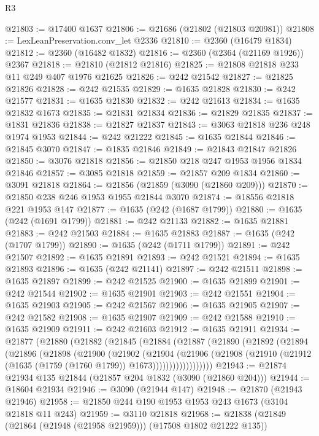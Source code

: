 \begin{lexlean}{R3}
\begin{coremodule}
@21803 := @17400 @1637
@21806 := @21686 (@21802 (@21803 @20981))
@21808 := LexLeanPreservation.conv_let @2336
@21810 := @2360 (@16479 @1834)
@21812 := @2360 (@16482 @1832)
@21816 := @2360 (@2364 (@21169 @1926)) @2367
@21818 := @21810 (@21812 @21816)
@21825 := @21808 @21818 @233 @11 @249 @407 @1976 @21625
@21826 := @242 @21542
@21827 := @21825 @21826
@21828 := @242 @21535
@21829 := @1635 @21828
@21830 := @242 @21577
@21831 := @1635 @21830
@21832 := @242 @21613
@21834 := @1635 @21832 @1673
@21835 := @21831 @21834
@21836 := @21829 @21835
@21837 := @1831 @21836
@21838 := @21827 @21837
@21843 := @3063 @21818 @236 @248 @1974 @1953
@21844 := @242 @21222
@21845 := @1635 @21844
@21846 := @21845 @3070
@21847 := @1835 @21846
@21849 := @21843 @21847 @21826
@21850 := @3076 @21818
@21856 := @21850 @218 @247 @1953 @1956 @1834 @21846
@21857 := @3085 @21818
@21859 := @21857 @209 @1834
@21860 := @3091 @21818
@21864 := @21856 (@21859 (@3090 (@21860 @209)))
@21870 := @21850 @238 @246 @1953 @1955 @21844 @3070
@21874 := @18556 @21818 @221 @1953 @147
@21877 := @1635 (@242 (@1687 @1799))
@21880 := @1635 (@242 (@1691 @1799))
@21881 := @242 @21133
@21882 := @1635 @21881
@21883 := @242 @21503
@21884 := @1635 @21883
@21887 := @1635 (@242 (@1707 @1799))
@21890 := @1635 (@242 (@1711 @1799))
@21891 := @242 @21507
@21892 := @1635 @21891
@21893 := @242 @21521
@21894 := @1635 @21893
@21896 := @1635 (@242 @21141)
@21897 := @242 @21511
@21898 := @1635 @21897
@21899 := @242 @21525
@21900 := @1635 @21899
@21901 := @242 @21544
@21902 := @1635 @21901
@21903 := @242 @21551
@21904 := @1635 @21903
@21905 := @242 @21567
@21906 := @1635 @21905
@21907 := @242 @21582
@21908 := @1635 @21907
@21909 := @242 @21588
@21910 := @1635 @21909
@21911 := @242 @21603
@21912 := @1635 @21911
@21934 := @21877
    (@21880
      (@21882
        (@21845
          (@21884
            (@21887
              (@21890
                (@21892
                  (@21894
                    (@21896
                      (@21898
                        (@21900
                          (@21902
                            (@21904
                              (@21906
                                (@21908
                                  (@21910
                                    (@21912 (@1635 (@1759 (@1760 @1799)) @1673))))))))))))))))))
@21943 := @21874 @21934 @135 @21844 (@21857 @204 @1832 (@3090 (@21860 @204)))
@21944 := @18604 @21934
@21946 := @3090 (@21944 @147)
@21948 := @21870 (@21943 @21946)
@21958 := @21850 @244 @190 @1953 @1953 @243 @1673 (@3104 @21818 @11 @243)
@21959 := @3110 @21818
@21968 := @21838 (@21849 (@21864 (@21948 (@21958 @21959))) (@17508 @1802 @21222 @135))

\end{coremodule}
\end{lexlean}
